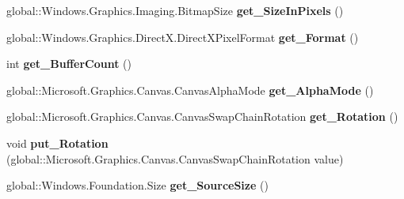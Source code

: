 \begin{DoxyCompactItemize}
\mbox{\label{interface_microsoft_1_1_graphics_1_1_canvas_1_1_i_canvas_swap_chain_a3d6681ade03b642ae899d612f2725a9a}} 
global\+::\+Windows.\+Graphics.\+Imaging.\+Bitmap\+Size {\bfseries get\+\_\+\+Size\+In\+Pixels} ()
\item 
\mbox{\label{interface_microsoft_1_1_graphics_1_1_canvas_1_1_i_canvas_swap_chain_a6fb78df6d196feac81f54bcbb0f8dfa4}} 
global\+::\+Windows.\+Graphics.\+Direct\+X.\+Direct\+X\+Pixel\+Format {\bfseries get\+\_\+\+Format} ()
\item 
\mbox{\label{interface_microsoft_1_1_graphics_1_1_canvas_1_1_i_canvas_swap_chain_a33e552e317fa0af44a3768d918cfc3b1}} 
int {\bfseries get\+\_\+\+Buffer\+Count} ()
\item 
\mbox{\label{interface_microsoft_1_1_graphics_1_1_canvas_1_1_i_canvas_swap_chain_aec4483702807638006acc34e237b1e23}} 
global\+::\+Microsoft.\+Graphics.\+Canvas.\+Canvas\+Alpha\+Mode {\bfseries get\+\_\+\+Alpha\+Mode} ()
\item 
\mbox{\label{interface_microsoft_1_1_graphics_1_1_canvas_1_1_i_canvas_swap_chain_a8e56717493f8cd2abe583fe0b23dbc81}} 
global\+::\+Microsoft.\+Graphics.\+Canvas.\+Canvas\+Swap\+Chain\+Rotation {\bfseries get\+\_\+\+Rotation} ()
\item 
\mbox{\label{interface_microsoft_1_1_graphics_1_1_canvas_1_1_i_canvas_swap_chain_a931e117cf8d541e0154abccf052807fb}} 
void {\bfseries put\+\_\+\+Rotation} (global\+::\+Microsoft.\+Graphics.\+Canvas.\+Canvas\+Swap\+Chain\+Rotation value)
\item 
\mbox{\label{interface_microsoft_1_1_graphics_1_1_canvas_1_1_i_canvas_swap_chain_ae2841a44387495cf2aecbadd50cae216}} 
global\+::\+Windows.\+Foundation.\+Size {\bfseries get\+\_\+\+Source\+Size} ()
\item 

\end{DoxyCompactItemize}
